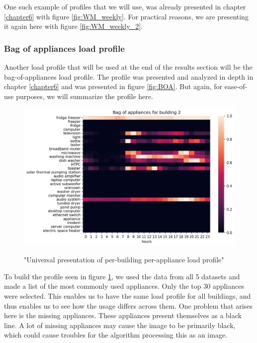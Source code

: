 One such example of profiles that we will use, was already presented in chapter \ref{chapter6} with figure \ref{fig:WM_weekly}.
For practical reasons, we are presenting it again here with figure \ref{fig:WM_weekly_2}.

\subsubsection{Bag of appliances load profile}

Another load profile that will be used at the end of the results section will be the bag-of-appliances load profile.
The profile was presented and analyzed in depth in chapter \ref{chapter6} and was presented in figure \ref{fig:BOA}.
But again, for ease-of-use purposes, we will summarize the profile here.

\begin{figure}[H]
	\centering
	\caption{"Universal presentation of per-building per-appliance load profile"}
	\includegraphics[width=1\textwidth]{../Figures/LPS/BOA.png}
	\label{fig:BOA2}
\end{figure}

To build the profile seen in figure \ref{fig:BOA2}, we used the data from all 5 datasets and made a list of the most commonly used appliances.
Only the top 30 appliances were selected.
This enables us to have the same load profile for all buildings, and thus enables us to see how the usage differs across them.
One problem that arises here is the missing appliances.
These appliances present themselves as a black line.
A lot of missing appliances may cause the image to be primarily black,
which could cause troubles for the algorithm processing this as an image.

